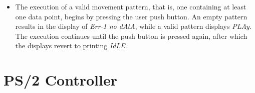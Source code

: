 \documentclass[]{article}
\begin{document}
\begin{itemize}
    \item The execution of a valid movement pattern, that is, one containing at least one data point, begins by pressing the user push button. An empty pattern results in the display of \emph{Err-1 no dAtA}, while a valid pattern displays \emph{PLAy}. The execution continues until the push button is pressed again, after which the displays revert to printing \emph{IdLE}.
\end{itemize}





\clearpage
\appendix

\section{PS/2 Controller}\label{apx:ps2_controller}

\end{document}
